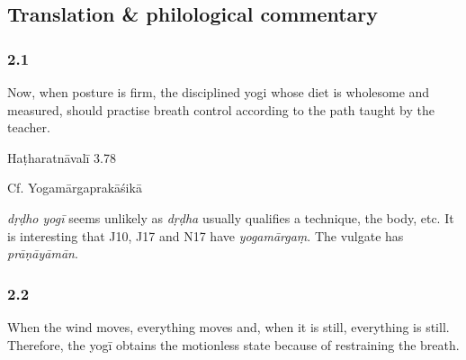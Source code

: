 


\pagestyle{HPed}
\begin{ekdosis}

\chapter*{Translation \& philological commentary}
\subsection*{2.1}
\begin{translation}[hp02_001]
Now, when posture is firm, the disciplined yogi whose diet is wholesome and measured, should practise breath control according to the path taught by the teacher.
\end{translation}

\begin{sources}[hp02_001]
\end{sources}

\begin{testimonia}[hp02_001]
Haṭharatnāvalī 3.78

\begin{versinnote}
\end{versinnote}

Cf. Yogamārgaprakāśikā

\begin{versinnote}
\end{versinnote}
\end{testimonia}

\begin{philcomm}[hp02_001]
\emph{dṛḍho yogī} seems unlikely as \emph{dṛḍha} usually qualifies a technique, the body, etc.
It is interesting that J10, J17 and N17 have \emph{yogamārgaṃ}. The vulgate has \emph{prāṇāyāmān}.
\end{philcomm}

\subsection*{2.2}
\begin{translation}[hp02_002]
When the wind moves, everything moves and, when it is still, everything is still. Therefore, the yogī obtains the motionless state because of restraining the breath.
\end{translation}


\end{ekdosis}
